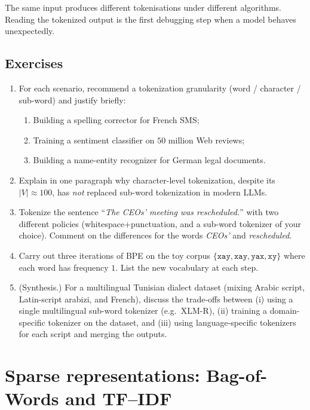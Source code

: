 \documentclass[12pt,a4paper]{report}
\theoremstyle{definition}
\theoremstyle{remark}
\begin{document}
The same input produces different tokenisations under different algorithms. Reading the tokenized output is the first debugging step when a model behaves unexpectedly.

\subsection{Exercises}
\begin{enumerate}
    \item For each scenario, recommend a tokenization granularity (word / character / sub-word) and justify briefly:
    \begin{enumerate}
        \item Building a spelling corrector for French SMS;
        \item Training a sentiment classifier on $50$ million Web reviews;
        \item Building a name-entity recognizer for German legal documents.
    \end{enumerate}
    \item Explain in one paragraph why character-level tokenization, despite its $|V| \approx 100$, has \emph{not} replaced sub-word tokenization in modern LLMs.
    \item Tokenize the sentence ``\emph{The CEOs' meeting was rescheduled.}'' with two different policies (whitespace+punctuation, and a sub-word tokenizer of your choice). Comment on the differences for the words \emph{CEOs'} and \emph{rescheduled}.
    \item Carry out three iterations of BPE on the toy corpus $\{\texttt{xay}, \texttt{xay}, \texttt{yax}, \texttt{xy}\}$ where each word has frequency $1$. List the new vocabulary at each step.
    \item (Synthesis.) For a multilingual Tunisian dialect dataset (mixing Arabic script, Latin-script arabizi, and French), discuss the trade-offs between (i) using a single multilingual sub-word tokenizer (e.g.\ XLM-R), (ii) training a domain-specific tokenizer on the dataset, and (iii) using language-specific tokenizers for each script and merging the outputs.
\end{enumerate}

\section{Sparse representations: Bag-of-Words and TF--IDF}
\label{sec:sparse}
\end{document}
